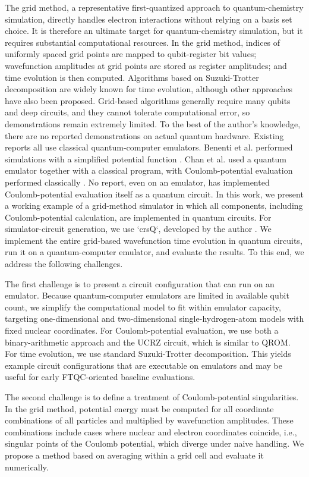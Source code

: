 \documentclass[a4paper,11pt]{article}
\begin{document}
The grid method, a representative first-quantized approach to quantum-chemistry
simulation, directly handles electron interactions without relying on a basis
set choice. It is therefore an ultimate target for quantum-chemistry
simulation, but it requires substantial computational resources. In the grid
method, indices of uniformly spaced grid points are mapped to qubit-register
bit values; wavefunction amplitudes at grid points are stored as register
amplitudes; and time evolution is then computed. Algorithms based on
Suzuki-Trotter decomposition are widely known for time evolution, although other
approaches have also been proposed. Grid-based algorithms generally require many
qubits and deep circuits, and they cannot tolerate computational error, so
demonstrations remain extremely limited. To the best of the author’s knowledge,
there are no reported demonstrations on actual quantum hardware. Existing
reports all use classical quantum-computer emulators. Benenti et al. performed
simulations with a simplified potential function
\cite{Benenti2008.10.1119/1.2894532}. Chan et al. used a quantum emulator
together with a classical program, with Coulomb-potential evaluation performed
classically \cite{Chan2023.sciadv.abo7484}. No report, even on an emulator,
has implemented Coulomb-potential evaluation itself as a quantum circuit. In
this work, we present a working example of a grid-method simulator in which all
components, including Coulomb-potential calculation, are implemented in quantum
circuits. For simulator-circuit generation, we use `crsQ`, developed by the
author \cite{takahashi2024.doi:10.1021/acs.jctc.4c00708}. We implement the
entire grid-based wavefunction time evolution in quantum circuits, run it on a
quantum-computer emulator, and evaluate the results. To this end, we address
the following challenges.

The first challenge is to present a circuit configuration that can run on an
emulator. Because quantum-computer emulators are limited in available qubit
count, we simplify the computational model to fit within emulator capacity,
targeting one-dimensional and two-dimensional single-hydrogen-atom models with
fixed nuclear coordinates. For Coulomb-potential evaluation, we use both a
binary-arithmetic approach and the UCRZ circuit, which is similar to QROM. For
time evolution, we use standard Suzuki-Trotter decomposition. This yields
example circuit configurations that are executable on emulators and may be
useful for early FTQC-oriented baseline evaluations.

The second challenge is to define a treatment of Coulomb-potential
singularities. In the grid method, potential energy must be computed for all
coordinate combinations of all particles and multiplied by wavefunction
amplitudes. These combinations include cases where nuclear and electron
coordinates coincide, i.e., singular points of the Coulomb potential, which
diverge under naive handling. We propose a method based on averaging within a
grid cell and evaluate it numerically.
\end{document}
